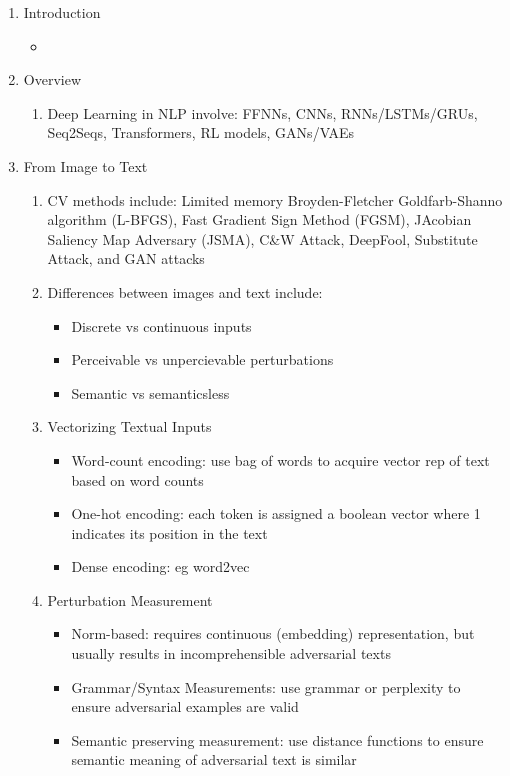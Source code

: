 \documentclass{article}
\begin{document}
\begin{enumerate}
	\item Introduction
	\begin{itemize}
		\item 
	\end{itemize}
	\item Overview
	\begin{enumerate}
		\item Deep Learning in NLP involve: FFNNs, CNNs, RNNs/LSTMs/GRUs, Seq2Seqs, Transformers, RL models, GANs/VAEs
	\end{enumerate}
	\item From Image to Text
	\begin{enumerate}
		\item CV methods include: Limited memory Broyden-Fletcher Goldfarb-Shanno algorithm (L-BFGS), Fast Gradient Sign Method (FGSM), JAcobian Saliency Map Adversary (JSMA), C\&W Attack, DeepFool, Substitute Attack, and GAN attacks
		\item Differences between images and text include:
		\begin{itemize}
			\item Discrete vs continuous inputs
			\item Perceivable vs unpercievable perturbations
			\item Semantic vs semanticsless
		\end{itemize}
		\item Vectorizing Textual Inputs
		\begin{itemize}
			\item Word-count encoding: use bag of words to acquire vector rep of text based on word counts
			\item One-hot encoding: each token is assigned a boolean vector where 1 indicates its position in the text
			\item Dense encoding: eg word2vec
		\end{itemize}
		\item Perturbation Measurement
		\begin{itemize}
			\item Norm-based: requires continuous (embedding) representation, but usually results in incomprehensible adversarial texts
			\item Grammar/Syntax Measurements: use grammar or perplexity to ensure adversarial examples are valid
			\item Semantic preserving measurement: use distance functions to ensure semantic meaning of adversarial text is similar

\end{itemize}
\end{enumerate}
\end{enumerate}
\end{document}

